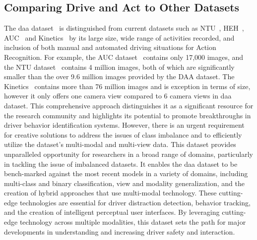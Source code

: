 \subsection{Comparing Drive and Act to Other Datasets}
The \gls{daa} dataset~\citep{martin2019drive_and_act_2019_iccv} is distinguished from current datasets such as NTU~\citep{DBLP:journals/corr/NTUShahroudyLNW16}, HEH~\citep{HEHOhnBar2014HandGR}, AUC~\citep{DBLP:journals/corr/AUCDDAbouelnagaEM17} and Kinetics~\citep{DBLP:journals/corr/KineticsCarreiraZ17} by its large size, wide range of activities recorded, and inclusion of both manual and automated driving situations for Action Recognition. 
For example, the AUC dataset~\citep{DBLP:journals/corr/AUCDDAbouelnagaEM17} contains only 17,000 images, and the NTU dataset~\citep{DBLP:journals/corr/NTUShahroudyLNW16} contains 4 million images, both of which are significantly smaller than the over 9.6 million images provided by the DAA dataset. The Kinetics~\citep{DBLP:journals/corr/KineticsCarreiraZ17} contains more than 76 million images and is exception in terms of size, however it only offers one camera view compared to 6 camera views in \gls{daa} dataset. This comprehensive approach distinguishes it as a significant resource for the research community and highlights its potential to promote breakthroughs in driver behavior identification systems. However, there is an urgent requirement for creative solutions to address the issues of class imbalance and to efficiently utilize the dataset's multi-modal and multi-view data. This dataset provides unparalleled opportunity for researchers in a broad range of domains, particularly in tackling the issue of imbalanced datasets. It enables the \gls{daa} dataset to be bench-marked against the most recent models in a variety of domains, including multi-class and binary classification, view and modality generalization, and the creation of hybrid approaches that use multi-modal technology. These cutting-edge technologies are essential for driver distraction detection, behavior tracking, and the creation of intelligent perceptual user interfaces. By leveraging cutting-edge technology across multiple modalities, this dataset sets the path for major developments in understanding and increasing driver safety and interaction.


